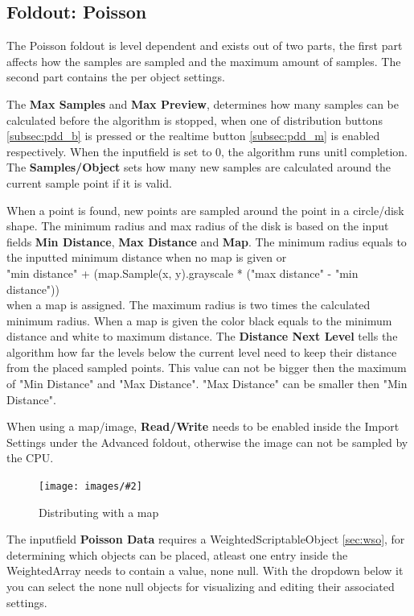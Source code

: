 \documentclass{paper}
\newlength{\imgwidth} %
\newcommand\scalegraphics[3][]
{
	\begin{figure}[H]
	\centering
	\settowidth{\imgwidth}{\texttt{[image: images/\#2]}} %
	\setlength{\imgwidth}{\minof{#1\imgwidth}{\textwidth}} %
	\texttt{[image: images/\#2]} %
	\caption{#3}
	\end{figure}
}
\newcommand*\bracket[1]{\lbrack#1\rbrack} %
\begin{document}
\subsection{Foldout: Poisson}\label{subsec:pdd_p}
The Poisson foldout is level dependent and exists out of two parts, the first part affects how the samples are sampled and the maximum amount of samples. The second part contains the per object settings.
\par
The \textbf{Max Samples} and \textbf{Max Preview}, determines how many samples can be calculated before the algorithm is stopped, when one of distribution buttons \bracket{\ref{subsec:pdd_b}} is pressed or the realtime button \bracket{\ref{subsec:pdd_m}} is enabled respectively. When the inputfield is set to 0, the algorithm runs unitl completion. The \textbf{Samples/Object} sets how many new samples are calculated around the current sample point if it is valid.
\par
When a point is found, new points are sampled around the point in a circle/disk shape. The minimum radius and max radius of the disk is based on the input fields \textbf{Min Distance}, \textbf{Max Distance} and \textbf{Map}. The minimum radius equals to the inputted minimum distance when no map is given or\\
\qquad "min distance" + (map.Sample(x, y).grayscale * ("max distance" - "min distance"))\\
when a map is assigned. The maximum radius is two times the calculated minimum radius. When a map is given the color black equals to the minimum distance and white to maximum distance. The \textbf{Distance Next Level} tells the algorithm how far the levels below the current level need to keep their distance from the placed sampled points. This value can not be bigger then the maximum of "Min Distance" and "Max Distance". "Max Distance" can be smaller then "Min Distance". 
\par
When using a map/image, \textbf{Read/Write} needs to be enabled inside the Import Settings under the Advanced foldout, otherwise the image can not be sampled by the CPU.

\scalegraphics[0.6]{Poisson_Map.png}{Distributing with a map}

The inputfield \textbf{Poisson Data} requires a WeightedScriptableObject \bracket{\ref{sec:wso}}, for determining which objects can be placed, atleast one entry inside the WeightedArray needs to contain a value, none null. With the dropdown below it you can select the none null objects for visualizing and editing their associated settings.
\end{document}
